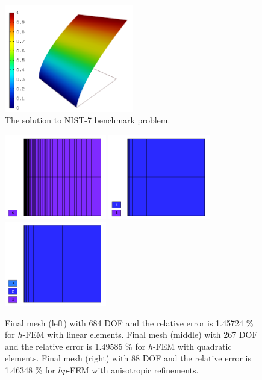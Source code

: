 \documentclass[12pt]{elsarticle}
\begin{document}
\begin{figure}[H]
\centering
\vspace{-3mm}
\includegraphics[height=4.7cm]{nist/nist-7/solution.png}
\vspace{-3mm}
\caption{The solution to NIST-7 benchmark problem.}
\vspace{-2mm}
\label{fig:sln-nist07}
\end{figure}

\begin{figure}[H]
\centering
\vspace{-5mm}
\includegraphics[height=3.7cm]{nist/nist-7/mesh_h1_aniso.png}
\includegraphics[height=3.7cm]{nist/nist-7/mesh_h2_aniso.png}
\includegraphics[height=3.7cm]{nist/nist-7/mesh_hp_aniso.png}
\vspace{-3mm}
\caption{
Final mesh (left) with 684 DOF and the relative error is 1.45724 \% for $h$-FEM with linear elements.
Final mesh (middle) with 267 DOF and the relative error is 1.49585 \% for $h$-FEM with quadratic elements.
Final mesh (right) with 88 DOF and the relative error is 1.46348 \% for $hp$-FEM with anisotropic refinements.}
\vspace{-5mm}
\label{fig:nist-7-hp-aniso}
\end{figure}
\end{document}
